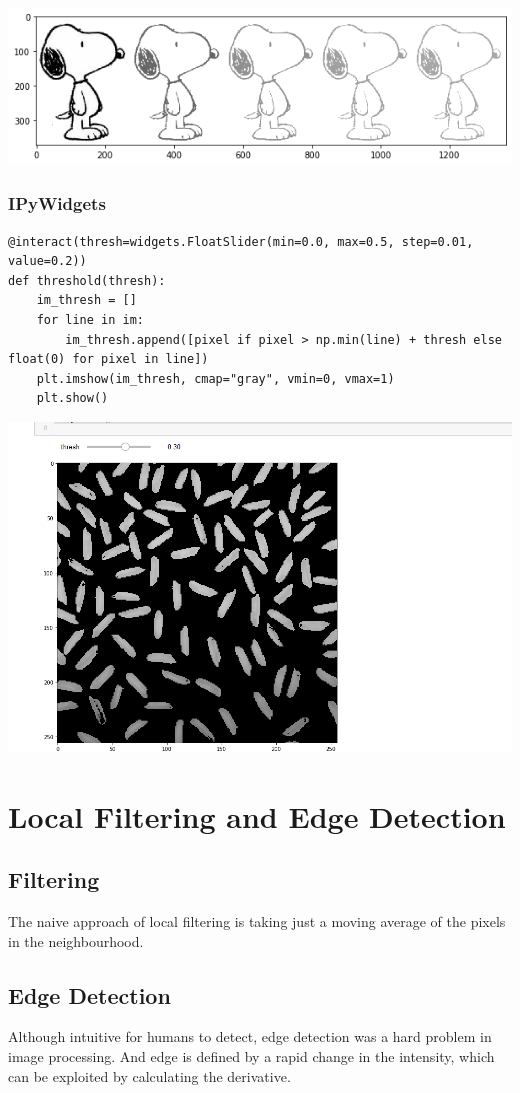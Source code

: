 \documentclass[11pt]{article}
\begin{document}
\begin{center}
	\includegraphics[width=0.7\linewidth]{img/snoopy_fade}
\end{center}

\subsubsection{IPyWidgets}
\begin{verbatim}
@interact(thresh=widgets.FloatSlider(min=0.0, max=0.5, step=0.01, value=0.2))
def threshold(thresh):
	im_thresh = []
	for line in im:
		im_thresh.append([pixel if pixel > np.min(line) + thresh else float(0) for pixel in line])
	plt.imshow(im_thresh, cmap="gray", vmin=0, vmax=1)
	plt.show()
\end{verbatim}

\begin{center}
	\includegraphics[width=0.6\linewidth]{img/ipywidgets_example}
\end{center}

\section{Local Filtering and Edge Detection}
\subsection{Filtering}
The naive approach of local filtering is taking just a moving average of the pixels in the neighbourhood.

\subsection{Edge Detection}
Although intuitive for humans to detect, edge detection was a hard problem in image processing. And edge is defined by a rapid change in the intensity, which can be exploited by calculating the derivative.
\end{document}
